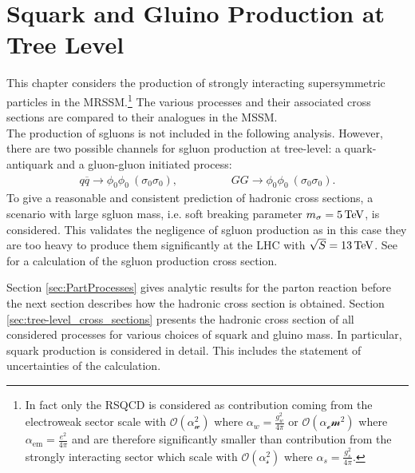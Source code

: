 \section{Squark and Gluino Production at Tree Level}\label{sec:SquarkGluinoTree}
This chapter considers the production of strongly interacting supersymmetric particles in the MRSSM.\footnote{In fact only the RSQCD is considered as contribution coming from the electroweak sector scale with $\mathcal{O(\alpha_w^2)}$ where $\alpha_w = \frac{g_w^2}{4\pi}$ or $\mathcal{O(\alpha_em^2)}$ where $\alpha_{\mathrm{em}} = \frac{e^2}{4\pi}$ and are therefore significantly smaller than contribution from the strongly interacting sector which scale with $\mathcal{O(\alpha_s^2)}$ where $\alpha_s = \frac{g_s^2}{4\pi}$.} The various processes and their associated cross sections are compared to their analogues in the MSSM.\\
The production of sgluons is not included in the following analysis. However, there are two possible channels for sgluon production at tree-level: a quark-antiquark and a gluon-gluon initiated process:
\begin{align}
q\overline{q} \to \phi_0\phi_0\ (\sigma_0\sigma_0), \hspace{2cm} GG \to \phi_0\phi_0\ (\sigma_0\sigma_0).
\end{align}
To give a reasonable and consistent prediction of hadronic cross sections, a scenario with large sgluon mass, i.e. soft breaking parameter $m_\sigma = \unit[5]{TeV}$, is considered. This validates the negligence of sgluon production as in this case they are too heavy to produce them significantly at the LHC with $\sqrt{S} = \unit[13]{TeV}$. See \cite{Choi:2008ub, GoncalvesNetto:2012nt, phdWojciech} for a calculation of the sgluon production cross section. Section \ref{sec:PartProcesses} gives analytic results for the parton reaction before the next section describes how the hadronic cross section is obtained. Section \ref{sec:tree-level_cross_sections} presents the hadronic cross section of all considered processes for various choices of squark and gluino mass. In particular, squark production is considered in detail. This includes the statement of uncertainties of the calculation.




